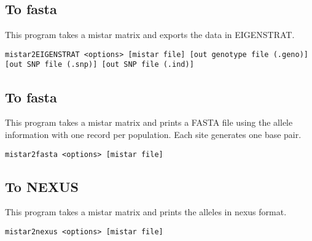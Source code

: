 \documentclass[a4paper]{article}
\begin{document}
\subsection{To fasta}
This program takes a mistar matrix and exports the data in EIGENSTRAT.
\tiny
\begin{verbatim}
mistar2EIGENSTRAT <options> [mistar file] [out genotype file (.geno)] [out SNP file (.snp)] [out SNP file (.ind)]
\end{verbatim}
\normalsize
\subsection{To fasta}

This program takes a mistar matrix and prints a FASTA file using the allele information with one record per population. Each site generates one base pair.

\begin{verbatim}
mistar2fasta <options> [mistar file] 
\end{verbatim}

\subsection{To NEXUS}

This program takes a mistar matrix and prints the alleles in nexus format.

\begin{verbatim}
mistar2nexus <options> [mistar file]
\end{verbatim}






\newpage





%

\end{document}
